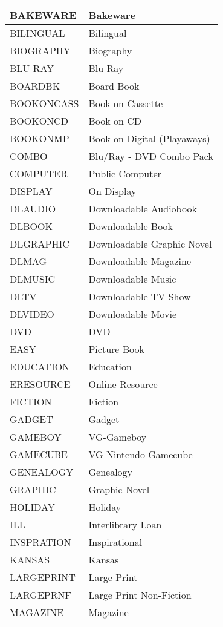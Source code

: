 \documentclass[letterpaper,10pt,english]{sphinxmanual}
\begin{document}
\begin{savenotes}
\begin{longtable}{|l|l|}
BAKEWARE
&
Bakeware
\\
\hline
BILINGUAL
&
Bilingual
\\
\hline
BIOGRAPHY
&
Biography
\\
\hline
BLU-RAY
&
Blu-Ray
\\
\hline
BOARDBK
&
Board Book
\\
\hline
BOOKONCASS
&
Book on Cassette
\\
\hline
BOOKONCD
&
Book on CD
\\
\hline
BOOKONMP
&
Book on Digital (Playaways)
\\
\hline
COMBO
&
Blu/Ray - DVD Combo Pack
\\
\hline
COMPUTER
&
Public Computer
\\
\hline
DISPLAY
&
On Display
\\
\hline
DLAUDIO
&
Downloadable Audiobook
\\
\hline
DLBOOK
&
Downloadable Book
\\
\hline
DLGRAPHIC
&
Downloadable Graphic Novel
\\
\hline
DLMAG
&
Downloadable Magazine
\\
\hline
DLMUSIC
&
Downloadable Music
\\
\hline
DLTV
&
Downloadable TV Show
\\
\hline
DLVIDEO
&
Downloadable Movie
\\
\hline
DVD
&
DVD
\\
\hline
EASY
&
Picture Book
\\
\hline
EDUCATION
&
Education
\\
\hline
ERESOURCE
&
Online Resource
\\
\hline
FICTION
&
Fiction
\\
\hline
GADGET
&
Gadget
\\
\hline
GAMEBOY
&
VG-Gameboy
\\
\hline
GAMECUBE
&
VG-Nintendo Gamecube
\\
\hline
GENEALOGY
&
Genealogy
\\
\hline
GRAPHIC
&
Graphic Novel
\\
\hline
HOLIDAY
&
Holiday
\\
\hline
ILL
&
Interlibrary Loan
\\
\hline
INSPRATION
&
Inspirational
\\
\hline
KANSAS
&
Kansas
\\
\hline
LARGEPRINT
&
Large Print
\\
\hline
LARGEPRNF
&
Large Print Non-Fiction
\\
\hline
MAGAZINE
&
Magazine
\\

\end{longtable}
\end{savenotes}
\end{document}
